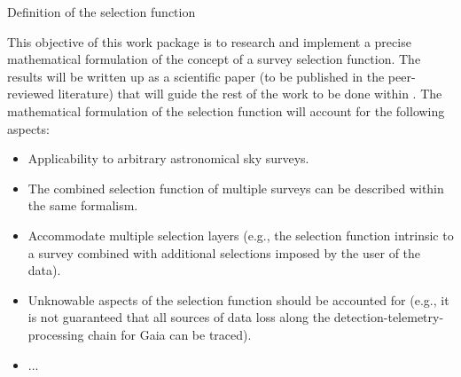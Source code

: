 \begin{workpackage}{Definition of the selection function}
  \label{wp:selfundefinition}
  
  \makewptable %

  \begin{wpobjectives}
    This objective of this work package is to research and implement a precise mathematical formulation of the concept of a survey selection function. The results will be written up as a scientific paper (to be published in the peer-reviewed literature) that will guide the rest of the work to be done within {\acro}.  The mathematical formulation of the selection function will account for the following aspects:
    \begin{itemize}
        \item Applicability to arbitrary astronomical sky surveys.
        \item The combined selection function of multiple surveys can be described within the same formalism.
        \item Accommodate multiple selection layers (e.g., the selection function intrinsic to a survey combined with additional selections imposed by the user of the data).
        \item Unknowable aspects of the selection function should be accounted for (e.g., it is not guaranteed that all sources of data loss along the detection-telemetry-processing chain for Gaia can be traced).  
        \item ...
    \end{itemize}
  \end{wpobjectives}

  \begin{wpdescription}


\end{wpdescription}
\end{workpackage}
